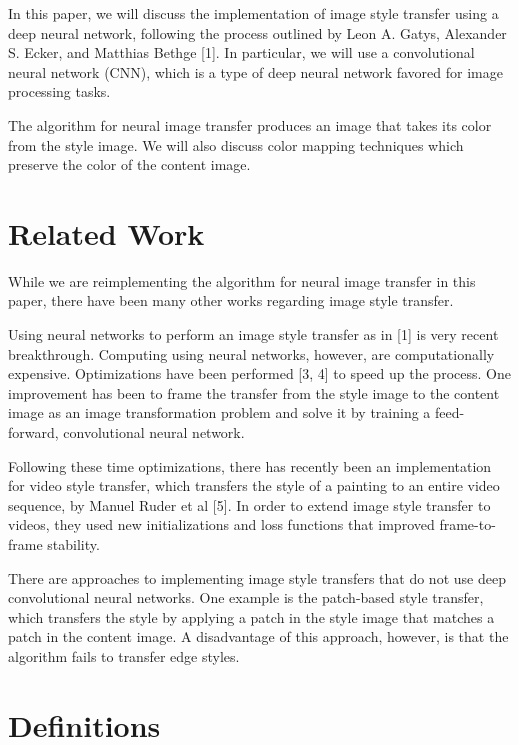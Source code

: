 \documentclass[10pt,twocolumn,letterpaper]{article}
\begin{document}
In this paper, we will discuss the implementation of image style transfer using a deep neural network, following the process outlined by Leon A. Gatys, Alexander S. Ecker, and Matthias Bethge [1]. In particular, we will use a convolutional neural network (CNN), which is a type of deep neural network favored for image processing tasks. 

The algorithm for neural image transfer produces an image that takes its color from the style image. We will also discuss color mapping techniques which preserve the color of the content image.

\section{Related Work}

While we are reimplementing the algorithm for neural image transfer in this paper, there have been many other works regarding image style transfer. 

Using neural networks to perform an image style transfer as in [1] is very recent breakthrough. Computing using neural networks, however, are computationally expensive. Optimizations have been performed [3, 4] to speed up the process. One improvement has been to frame the transfer from the style image to the content image as an image transformation problem and solve it by training a feed-forward, convolutional neural network. 

Following these time optimizations, there has recently been an implementation for video style transfer, which transfers the style of a painting to an entire video sequence, by Manuel Ruder et al [5]. In order to extend image style transfer to videos, they used new initializations and loss functions that improved frame-to-frame stability. 

There are approaches to implementing image style transfers that do not use deep convolutional neural networks. One example is the patch-based style transfer, which transfers the style by applying a patch in the style image that matches a patch in the content image. A disadvantage of this approach, however, is that the algorithm fails to transfer edge styles. 


\section{Definitions}
\end{document}
